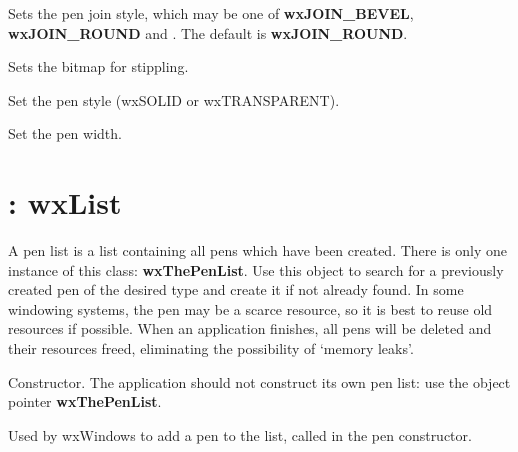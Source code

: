 

Sets the pen join style, which may be one of {\bf wxJOIN\_BEVEL}, {\bf wxJOIN\_ROUND} and
. The default is {\bf wxJOIN\_ROUND}.



Sets the bitmap for stippling.



Set the pen style (wxSOLID or wxTRANSPARENT).



Set the pen width.

\section{: wxList}\label{wxpenlist}

A pen list is a list containing all pens which have been created. There
is only one instance of this class: {\bf wxThePenList}.  Use this object to search
for a previously created pen of the desired type and create it if not already found.
In some windowing systems, the pen may be a scarce resource, so it is best to
reuse old resources if possible.  When an application finishes, all pens will be
deleted and their resources freed, eliminating the possibility of `memory leaks'.



Constructor.  The application should not construct its own pen list:
use the object pointer {\bf wxThePenList}.



Used by wxWindows to add a pen to the list, called in the pen constructor.



